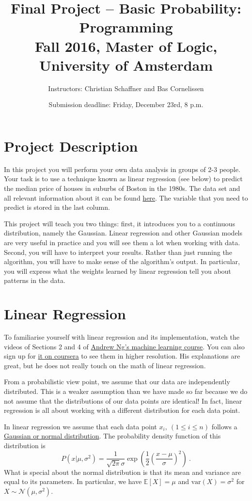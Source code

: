 \documentclass[11pt, leqno, a4paper]{article}
\title{Final Project -- Basic Probability: Programming\\[2mm]
\large{Fall 2016, Master of Logic, University of Amsterdam}}
\author{Instructors: Christian Schaffner and Bas Cornelissen}
\date{Submission deadline: Friday, December 23rd, 8 p.m.}
\begin{document}
\maketitle

\section{Project Description}

In this project you will perform your own data analysis in groups of 2-3 people. Your task is
to use a technique known as linear regression (see below) to predict the median price of houses
in suburbs of Boston in the 1980s. The data set and all relevant information about it can be found
\href{https://archive.ics.uci.edu/ml/datasets/Housing}{here}. The variable that you need
to predict is stored in the last column.

This project will teach you two things: first, it introduces you to a continuous distribution, namely
the Gaussian. Linear regression and other Gaussian models are very useful in practice and you will
see them a lot when working with data. Second, you will have to interpret your results. Rather than
just running the algorithm, you will have to make sense of the algorithm's output. In particular, you
will express what the weights learned by linear regression tell you about patterns in the data.

\section{Linear Regression}
To familiarise yourself with linear regression and its implementation, watch the
videos of Sections 2 and 4 of \href{https://www.youtube.com/watch?v=ylWBbxQHwFM&list=PLLH73N9cB21V_O2JqILVX557BST2cqJw4}{Andrew Ng's machine
learning course}. You can also sign up for \href{https://www.coursera.org/learn/machine-learning/home}{it on coursera} to see them
in higher resolution. His explanations are great, but he does not really touch on the math of linear regression.

From a probabilistic view point, we assume that our data are independently distributed. This is a weaker
assumption than we have made so far because we do not assume that the distributions of our data points
are identical! In fact, linear regression is all about working with a different distribution for each
data point. 

In linear regression we assume that each data point $ x_{i},\ (1 \leq i \leq n) $ follows a 
\href{https://en.wikipedia.org/wiki/Normal_distribution}{Gaussian or normal distribution}. The probability
density function of this distribution is
\begin{equation}
P(x|\mu, \sigma^{2}) = \frac{1}{\sqrt{2\pi}\sigma}\exp\left(\frac{1}{2}\left(\frac{x - \mu}{\sigma}\right)^{2}\right) \ .
\end{equation}
What is special about the normal distribution is that its mean and variance are equal to its parameters.
In particular, we have $ \mathbb{E}[X] = \mu $ and $ \text{var}(X) = \sigma^{2} $ for 
$ X \sim \mathcal{N}(\mu, \sigma^{2}) $.
\end{document}
